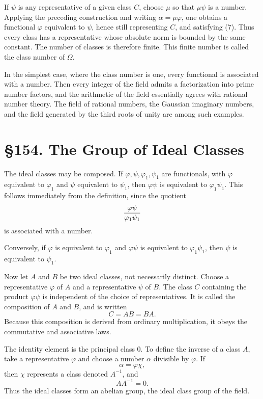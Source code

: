 \documentclass[11pt,a4paper]{book}
\newcommand{\webersection}[2]{\clearpage\section*{\S #1. #2}}
\begin{document}
If \(\psi\) is any representative of a given class \(C\), choose \(\mu\) so that \(\mu\psi\) is a number.  Applying the preceding construction and writing \(\alpha=\mu\varphi\), one obtains a functional \(\varphi\) equivalent to \(\psi\), hence still representing \(C\), and satisfying (7).  Thus every class has a representative whose absolute norm is bounded by the same constant.  The number of classes is therefore finite.  This finite number is called the class number of \(\Omega\).

In the simplest case, where the class number is one, every functional is associated with a number.  Then every integer of the field admits a factorization into prime number factors, and the arithmetic of the field essentially agrees with rational number theory.  The field of rational numbers, the Gaussian imaginary numbers, and the field generated by the third roots of unity are among such examples.

\webersection{154}{The Group of Ideal Classes}

The ideal classes may be composed.  If \(\varphi,\psi,\varphi_1,\psi_1\) are functionals, with \(\varphi\) equivalent to \(\varphi_1\) and \(\psi\) equivalent to \(\psi_1\), then \(\varphi\psi\) is equivalent to \(\varphi_1\psi_1\).  This follows immediately from the definition, since the quotient
\[
 {\varphi\psi\over \varphi_1\psi_1}
\]
is associated with a number.

Conversely, if \(\varphi\) is equivalent to \(\varphi_1\) and \(\varphi\psi\) is equivalent to \(\varphi_1\psi_1\), then \(\psi\) is equivalent to \(\psi_1\).

Now let \(A\) and \(B\) be two ideal classes, not necessarily distinct.  Choose a representative \(\varphi\) of \(A\) and a representative \(\psi\) of \(B\).  The class \(C\) containing the product \(\varphi\psi\) is independent of the choice of representatives.  It is called the composition of \(A\) and \(B\), and is written
\begin{equation}
 C=AB=BA. \tag{1}
\end{equation}
Because this composition is derived from ordinary multiplication, it obeys the commutative and associative laws.

The identity element is the principal class \(0\).  To define the inverse of a class \(A\), take a representative \(\varphi\) and choose a number \(\alpha\) divisible by \(\varphi\).  If
\[
 \alpha=\varphi\chi,
\]
then \(\chi\) represents a class denoted \(A^{-1}\), and
\begin{equation}
 AA^{-1}=0. \tag{2}
\end{equation}
Thus the ideal classes form an abelian group, the ideal class group of the field.
\end{document}
